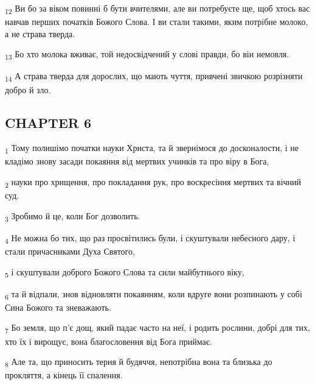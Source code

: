 \begin{tcolorbox}
\textsubscript{12} Ви бо за віком повинні б бути вчителями, але ви потребуєте ще, щоб хтось вас навчав перших початків Божого Слова. І ви стали такими, яким потрібне молоко, а не страва тверда.
\end{tcolorbox}
\begin{tcolorbox}
\textsubscript{13} Бо хто молока вживає, той недосвідчений у слові правди, бо він немовля.
\end{tcolorbox}
\begin{tcolorbox}
\textsubscript{14} А страва тверда для дорослих, що мають чуття, привчені звичкою розрізняти добро й зло.
\end{tcolorbox}
\subsection{CHAPTER 6}
\begin{tcolorbox}
\textsubscript{1} Тому полишімо початки науки Христа, та й звернімося до досконалости, і не кладімо знову засади покаяння від мертвих учинків та про віру в Бога,
\end{tcolorbox}
\begin{tcolorbox}
\textsubscript{2} науки про хрищення, про покладання рук, про воскресіння мертвих та вічний суд.
\end{tcolorbox}
\begin{tcolorbox}
\textsubscript{3} Зробимо й це, коли Бог дозволить.
\end{tcolorbox}
\begin{tcolorbox}
\textsubscript{4} Не можна бо тих, що раз просвітились були, і скуштували небесного дару, і стали причасниками Духа Святого,
\end{tcolorbox}
\begin{tcolorbox}
\textsubscript{5} і скуштували доброго Божого Слова та сили майбутнього віку,
\end{tcolorbox}
\begin{tcolorbox}
\textsubscript{6} та й відпали, знов відновляти покаянням, коли вдруге вони розпинають у собі Сина Божого та зневажають.
\end{tcolorbox}
\begin{tcolorbox}
\textsubscript{7} Бо земля, що п'є дощ, який падає часто на неї, і родить рослини, добрі для тих, хто їх і вирощує, вона благословення від Бога приймає.
\end{tcolorbox}
\begin{tcolorbox}
\textsubscript{8} Але та, що приносить терня й будяччя, непотрібна вона та близька до прокляття, а кінець її спалення.
\end{tcolorbox}
